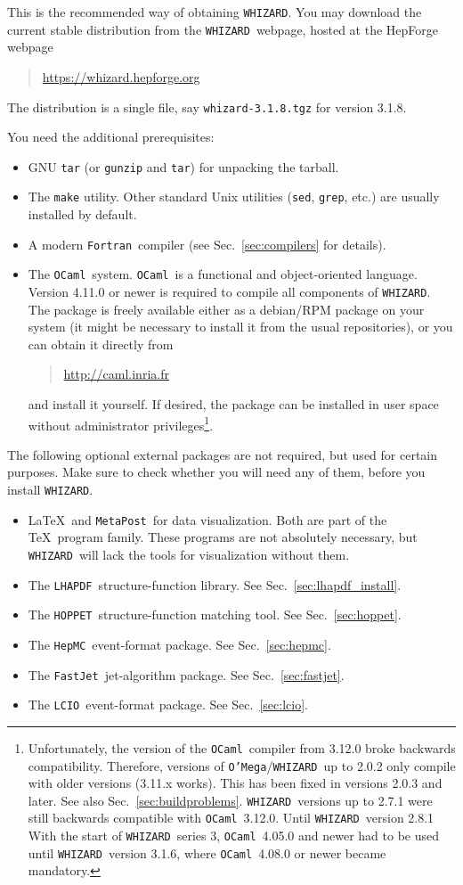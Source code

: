 \documentclass[12pt]{book}
\newcommand{\hepforgepage}{\url{https://whizard.hepforge.org}}
\newcommand{\ttt}[1]{\texttt{#1}}
\newcommand{\whizard}{\ttt{WHIZARD}}
\newcommand{\oMega}{\ttt{O'Mega}}
\newcommand{\lcio}{\ttt{LCIO}}
\newcommand{\lhapdf}{\ttt{LHAPDF}}
\newcommand{\hepmc}{\ttt{HepMC}}
\newcommand{\fastjet}{\ttt{FastJet}}
\newcommand{\hoppet}{\ttt{HOPPET}}
\newcommand{\metapost}{\ttt{MetaPost}}
\newcommand{\fortran}{\ttt{Fortran}}
\newcommand{\ocaml}{\ttt{OCaml}}
\newcommand{\thisversion}{3.1.8}
\begin{document}
This is the recommended way of obtaining \whizard.  You may download
the current stable distribution from the \whizard\ webpage,
hosted at the HepForge webpage
\begin{quote}
  \hepforgepage
\end{quote}
The distribution is a single file, say \ttt{whizard-\thisversion.tgz} for
version \thisversion.

You need the additional prerequisites:
\begin{itemize}
\item
  GNU \ttt{tar} (or \ttt{gunzip} and \ttt{tar}) for unpacking the
  tarball.
\item
  The \ttt{make} utility.  Other standard Unix utilities (\ttt{sed},
  \ttt{grep}, etc.) are usually installed by default.
\item
  A modern \fortran\ compiler (see Sec.~\ref{sec:compilers} for
  details).
\item
  The \ocaml\ system.  \ocaml\ is a functional and object-oriented
  language.  Version 4.11.0 or newer is required to compile all
  components of \whizard. The package is freely available either as a
  debian/RPM package on your system (it might be necessary to install
  it from the usual repositories), or you can obtain it directly from
  \begin{quote}
    \url{http://caml.inria.fr}
  \end{quote}
  and install it yourself.  If desired, the package can be installed
  in user space without administrator privileges\footnote{
    Unfortunately, the version of the \ocaml\
    compiler from 3.12.0 broke backwards compatibility. Therefore,
    versions of \oMega/\whizard\ up to 2.0.2 only compile with older
    versions (3.11.x works). This has been fixed in versions
    2.0.3 and later. See also
    Sec.~\ref{sec:buildproblems}. \whizard\ versions up to 2.7.1 were
    still backwards compatible with \ocaml\ 3.12.0. Until
    \whizard\ version 2.8.1 With the start of \whizard\ series 3,
    \ocaml\ 4.05.0 and newer had to be used until \whizard\ version
    3.1.6, where \ocaml\ 4.08.0 or newer became mandatory.}. 
\end{itemize}
The following optional external packages are not required, but used
for certain purposes.  Make sure to check whether you will need any of
them, before you install \whizard.
\begin{itemize}
\item
  \LaTeX\ and \metapost\ for data visualization.  Both are part of the
  \TeX\ program family.  These programs are not absolutely necessary,
  but \whizard\ will lack the tools for visualization without them.
\item
  The \lhapdf\ structure-function library.  See
  Sec.~\ref{sec:lhapdf_install}.
\item
  The \hoppet\ structure-function matching tool. See
  Sec.~\ref{sec:hoppet}.
\item
  The \hepmc\ event-format package.  See Sec.~\ref{sec:hepmc}.
\item
  The \fastjet\ jet-algorithm package.  See Sec.~\ref{sec:fastjet}.
\item
  The \lcio\ event-format package.  See Sec.~\ref{sec:lcio}.
\end{itemize}
\end{document}
